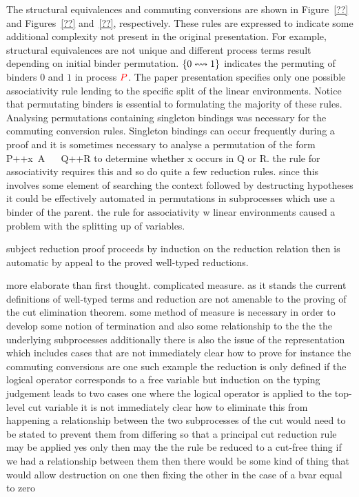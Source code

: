 






The structural equivalences and commuting conversions are shown in
Figure~\ref{??} and Figures~\ref{??} and~\ref{??}, respectively. These rules
are expressed to indicate some additional complexity not present in the
original presentation. For example, structural equivalences are not unique and
different process terms result depending on initial binder
permutation. $\left\{{0}\leftrightsquigarrow{1}\right\}$ indicates the permuting of binders $0$ and $1$ in
process ${\color{red} P}$. The paper presentation specifies only one possible
associativity rule lending to the specific split of the linear environments.
Notice that permutating binders is essential to formulating the majority of
these rules. Analysing permutations containing singleton bindings was
necessary for the commuting conversion rules. Singleton bindings can occur
frequently during a proof and it is sometimes necessary to analyse a
permutation of the form P++x~A ~~ Q++R to determine whether x occurs in Q or
R. the rule for associativity requires this and so do quite a few reduction
rules. since this involves some element of searching the context followed by
destructing hypotheses it could be effectively automated in permutations in
subprocesses which use a binder of the parent. the rule for associativity w
linear environments caused a problem with the splitting up of variables.


subject reduction proof proceeds by induction on the reduction relation then
is automatic by appeal to the proved well-typed reductions.


more elaborate than first thought. complicated measure.  as it stands the
current definitions of well-typed terms and reduction are not amenable to the
proving of the cut elimination theorem. some method of measure is necessary in
order to develop some notion of termination and also some relationship to the
the the underlying subprocesses additionally there is also the issue of the
representation which includes cases that are not immediately clear how to
prove for instance the commuting conversions are one such example the
reduction is only defined if the logical operator corresponds to a free
variable but induction on the typing judgement leads to two cases one where
the logical operator is applied to the top-level cut variable it is not
immediately clear how to eliminate this from happening a relationship between
the two subprocesses of the cut would need to be stated to prevent them from
differing so that a principal cut reduction rule may be applied yes only then
may the the rule be reduced to a cut-free thing if we had a relationship
between them then there would be some kind of thing that would allow
destruction on one then fixing the other in the case of a bvar equal to zero

